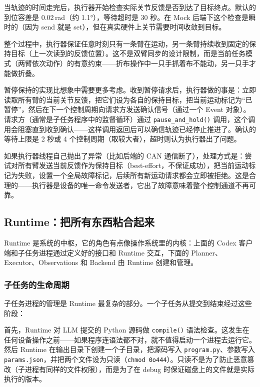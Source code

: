 当轨迹的时间走完后，执行器开始检查实际关节反馈是否到达了目标终点。默认的到位容差是 0.02\,rad（约 1.1°），等待超时是 30 秒。在 Mock 后端下这个检查是瞬时的（因为 send 就是 set），但在真实硬件上关节需要时间收敛到目标。

整个过程中，执行器保证任意时刻只有一条臂在运动，另一条臂持续收到固定的保持目标（上一次读到的反馈位置）。这不是双臂同步的设计限制，而是当前任务模式（两臂依次动作）的有意约束——折布操作中一只手抓着布不能动，另一只手才能做折叠。

暂停保持的实现比想象中需要更多考虑。收到暂停请求后，执行器做的事是：立即读取所有臂的当前关节反馈，把它们设为各自的保持目标，把当前运动标记为``已暂停''，然后在下一个控制周期向请求方发送确认信号（通过一个 Event 对象）。请求方（通常是子任务程序中的监督循环）通过 \texttt{pause\_and\_hold()} 调用，这个调用会阻塞直到收到确认——这样调用返回后可以确信轨迹已经停止推进了。确认的等待上限是 2 秒或 4 个控制周期（取较大者），超时则认为执行器出了问题。

如果执行器线程自己抛出了异常（比如后端的 CAN 通信断了），处理方式是：尝试对所有臂发送当前反馈作为保持目标（best-effort，不保证成功），把当前运动标记为失败，设置一个全局故障标记，后续所有新运动请求都会立即被拒绝。这是合理的——执行器是设备的唯一命令发送者，它出了故障意味着整个控制通道不再可靠。


\subsection{Runtime：把所有东西粘合起来}
\label{subsec:agent-runtime}

Runtime 是系统的中枢，它的角色有点像操作系统里的内核：上面的 Codex 客户端和子任务进程通过定义好的接口和 Runtime 交互，下面的 Planner、Executor、Observations 和 Backend 由 Runtime 创建和管理。

\subsubsection{子任务的生命周期}

子任务进程的管理是 Runtime 最复杂的部分。一个子任务从提交到结束经过这些阶段：

首先，Runtime 对 LLM 提交的 Python 源码做 \texttt{compile()} 语法检查。这发生在任何设备操作之前——如果程序连语法都不对，就不值得启动一个进程去运行它。然后 Runtime 在输出目录下创建一个子目录，把源码写入 \texttt{program.py}、参数写入 \texttt{params.json}，并把两个文件设为只读（\texttt{chmod 0o444}）。只读不是为了防止恶意篡改（子进程有同样的文件权限），而是为了在 debug 时保证磁盘上的文件就是实际执行的版本。

